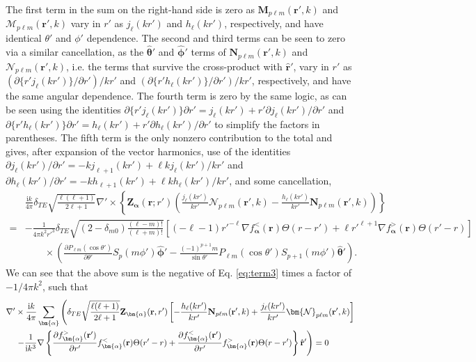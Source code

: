 The first term in the sum on the right-hand side is zero as $\mathbf{M}_{p\ell m}(\mathbf{r}',k)$ and $\bm{\mathcal{M}}_{p\ell m}(\mathbf{r}',k)$ vary in $r'$ as $j_\ell(kr')$ and $h_\ell(kr')$, respectively, and have identical $\theta'$ and $\phi'$ dependence. The second and third terms can be seen to zero via a similar cancellation, as the $\hat{\bm{\theta}}'$ and $\hat{\bm{\phi}}'$ terms of $\mathbf{N}_{p\ell m}(\mathbf{r}',k)$ and $\bm{\mathcal{N}}_{p\ell m}(\mathbf{r}',k)$, i.e. the terms that survive the cross-product with $\hat{\mathbf{r}}'$, vary in $r'$ as $(\partial\{r' j_\ell(kr')\}/\partial r')/kr'$ and $(\partial\{r' h_\ell(kr')\}/\partial r')/kr'$, respectively, and have the same angular dependence. The fourth term is zero by the same logic, as can be seen using the identities $\partial\{r'j_\ell(kr')\}\partial r' = j_\ell(kr') + r'\partial j_\ell(kr')/\partial r'$ and $\partial\{r'h_\ell(kr')\}\partial r' = h_\ell(kr') + r'\partial h_\ell(kr')/\partial r'$ to simplify the factors in parentheses. The fifth term is the only nonzero contribution to the total and gives, after expansion of the vector harmonics, use of the identities $\partial j_\ell(kr')/\partial r' = -kj_{\ell + 1}(kr') + \ell k j_\ell(kr')/kr'$ and $\partial h_\ell(kr')/\partial r' = -kh_{\ell + 1}(kr') + \ell k h_\ell(kr')/kr'$, and some cancellation,
\begin{equation}
\begin{split}
&\frac{\mathrm{i}k}{4\pi}\delta_{TE}\sqrt{\frac{\ell(\ell + 1)}{2\ell + 1}}\nabla'\times\left\{\mathbf{Z}_{\bm{\alpha}}(\mathbf{r};r')\left(\frac{j_\ell(kr')}{kr'}\bm{\mathcal{N}}_{p\ell m}(\mathbf{r}',k) - \frac{h_\ell(kr')}{kr'}\mathbf{N}_{p\ell m}(\mathbf{r}',k)\right)\right\}\\
=& -\frac{1}{4\pi k^2r'^3}\delta_{TE}\sqrt{(2 - \delta_{m0})\frac{(\ell - m)!}{(\ell + m)!}}\left[(-\ell - 1)r'^{-\ell}\nabla f_{\bm{\alpha}}^<(\mathbf{r})\Theta(r - r') + \ell r'^{\ell + 1}\nabla f_{\bm{\alpha}}^>(\mathbf{r})\Theta(r' - r)\right]\\
&\qquad\times\left(\frac{\partial P_{\ell m}(\cos\theta')}{\partial \theta'}S_p(m\phi')\hat{\bm{\phi}}' - \frac{(-1)^{p+1}m}{\sin\theta'}P_{\ell m}(\cos\theta')S_{p+1}(m\phi')\hat{\bm{\theta}}'\right).
\end{split}
\end{equation}
We can see that the above sum is the negative of Eq. \eqref{eq:term3} times a factor of $-1/4\pi k^2$, such that
\begin{equation}
\begin{split}
\nabla'&\times\frac{\mathrm{i}k}{4\pi}\sum_{\bm{\alpha}}\left(\delta_{TE}\sqrt{\frac{\ell(\ell + 1)}{2\ell + 1}}\mathbf{Z}_{\bm{\alpha}}(\mathbf{r},r')\left[-\frac{h_\ell(kr')}{kr'}\mathbf{N}_{p\ell m}(\mathbf{r}',k) + \frac{j_\ell(kr')}{kr'}\bm{\mathcal{N}}_{p\ell m}(\mathbf{r}',k)\right]\right.\\
&\left. -\frac{1}{\mathrm{i} k^3}\nabla\left\{\frac{\partial f_{\bm{\alpha}}^>(\mathbf{r}')}{\partial r'}f_{\bm{\alpha}}^<(\mathbf{r})\Theta(r' - r) + \frac{\partial f_{\bm{\alpha}}^<(\mathbf{r}')}{\partial r'}f_{\bm{\alpha}}^>(\mathbf{r})\Theta(r - r')\right\}\hat{\mathbf{r}}' \vphantom{\sqrt{\frac{\ell(\ell + 1)}{2\ell + 1}}} \right) = 0
\end{split}
\end{equation}
